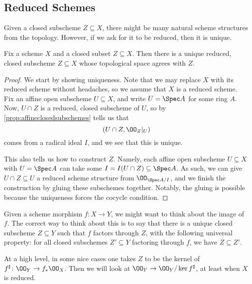 \documentclass[../notes.tex]{subfiles}
\begin{document}
\subsection{Reduced Schemes}
Given a closed subscheme $Z\subseteq X$, there might be many natural scheme structures from the topology. However, if we ask for it to be reduced, then it is unique.
\begin{proposition}
	Fix a scheme $X$ and a closed subset $Z\subseteq X$. Then there is a unique reduced, closed subscheme $Z\subseteq X$ whose topological space agrees with $Z$.
\end{proposition}
\begin{proof}
	We start by showing uniqueness. Note that we may replace $X$ with its reduced scheme without headaches, so we assume that $X$ is a reduced scheme. Fix an affine open subscheme $U\subseteq X$, and write $U=\Spec A$ for some ring $A$. Now, $U\cap Z$ is a reduced, closed subscheme of $U$, so by \autoref{prop:affineclosedsubschemes} tells us that
	\[(U\cap Z,\OO_{Z}|_U)\]
	comes from a radical ideal $I$, and we see that this is unique.

	This also tells us how to construct $Z$. Namely, each affine open subscheme $U\subseteq X$ with $U=\Spec A$ can take some $I=I(U\cap Z)\subseteq\Spec A$. As such, we can give $U\cap Z\subseteq U$ a reduced scheme structure from $\OO_{\Spec A/I}$, and we finish the construction by gluing these subschemes together. Notably, the gluing is possible because the uniqueness forces the cocycle condition.
\end{proof}
\begin{remark}
	Given a scheme morphism $f\colon X\to Y$, we might want to think about the image of $f$. The correct way to think about this is to say that there is a unique closed subscheme $Z\subseteq Y$ such that $f$ factors through $Z$, with the following universal property: for all closed subschemes $Z'\subseteq Y$ factoring through $f$, we have $Z\subseteq Z'$.

	At a high level, in some nice cases one takes $Z$ to be the kernel of $f^\sharp\colon\OO_Y\to f_*\OO_X$. Then we will look at $\OO_Y\to\OO_Y/\ker f^\sharp$, at least when $X$ is reduced.
\end{remark}
\end{document}
